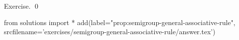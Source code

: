 
\begin{prop}
  \label{prop:semigroup-general-associative-rule}
  
\end{prop}
\proof
Exercise.
\qed
\begin{python0}
from solutions import *
add(label="prop:semigroup-general-associative-rule",
    srcfilename='exercises/semigroup-general-associative-rule/answer.tex') 
\end{python0}
